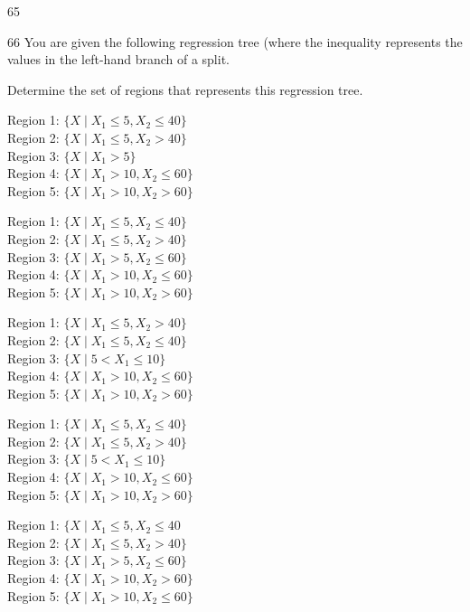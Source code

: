 \begin{question}{65}
\deleted
\end{question}

\begin{question}{66}
You are given the following regression tree (where the inequality represents the values in the left-hand branch of a split.


Determine the set of regions that represents this regression tree.

\begin{choices}
\item Region 1: $\{X \mid X_1 \leqslant 5, X_2 \leqslant 40\}$ \\
Region 2: $\{X \mid X_1 \leqslant 5, X_2 > 40\}$ \\
Region 3: $\{X \mid X_1 > 5\}$ \\
Region 4: $\{X \mid X_1 > 10, X_2 \leqslant 60\}$ \\
Region 5: $\{X \mid X_1 > 10, X_2 > 60\}$

\item Region 1: $\{X \mid X_1 \leqslant 5, X_2 \leqslant 40\}$ \\
Region 2: $\{X \mid X_1 \leqslant 5, X_2 > 40\}$ \\
Region 3: $\{X \mid X_1 > 5, X_2 \leqslant 60\}$ \\
Region 4: $\{X \mid X_1 > 10, X_2 \leqslant 60\}$ \\
Region 5: $\{X \mid X_1 > 10, X_2 > 60\}$

\item Region 1: $\{X \mid X_1 \leqslant 5, X_2 > 40\}$ \\
Region 2: $\{X \mid X_1 \leqslant 5, X_2 \leqslant 40\}$ \\
Region 3: $\{X \mid 5 < X_1 \leqslant 10\}$ \\
Region 4: $\{X \mid X_1 > 10, X_2 \leqslant 60\}$ \\
Region 5: $\{X \mid X_1 > 10, X_2 > 60\}$

\item Region 1: $\{X \mid X_1 \leqslant 5, X_2 \leqslant 40\}$ \\
Region 2: $\{X \mid X_1 \leqslant 5, X_2 > 40\}$ \\
Region 3: $\{X \mid 5 < X_1 \leqslant 10\}$ \\
Region 4: $\{X \mid X_1 > 10, X_2 \leqslant 60\}$ \\
Region 5: $\{X \mid X_1 > 10, X_2 > 60\}$

\item %
Region 1: $\{X \mid X_1 \leqslant 5, X_2 \leqslant 40$ \\
Region 2: $\{X \mid X_1 \leqslant 5, X_2 > 40\}$ \\
Region 3: $\{X \mid X_1 > 5, X_2 \leqslant 60\}$ \\
Region 4: $\{X \mid X_1 > 10, X_2 > 60\}$ \\
Region 5: $\{X \mid X_1 > 10, X_2 \leqslant 60\}$
\end{choices}
\end{question}
